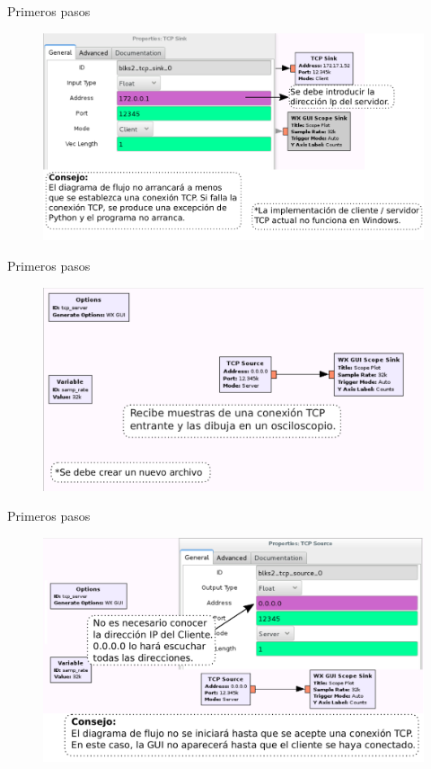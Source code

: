 \begin{frame}{Primeros pasos}
\begin{figure}[H]
\centering
\includegraphics[width=\textwidth]{lab1/pdf/lab1_24.pdf}
\end{figure}
\end{frame}

\begin{frame}{Primeros pasos}
\begin{figure}[H]
\centering
\includegraphics[width=\textwidth]{lab1/pdf/lab1_25.pdf}
\end{figure}
\end{frame}

\begin{frame}{Primeros pasos}
\begin{figure}[H]
\centering
\includegraphics[width=\textwidth]{lab1/pdf/lab1_26.pdf}
\end{figure}
\end{frame}

